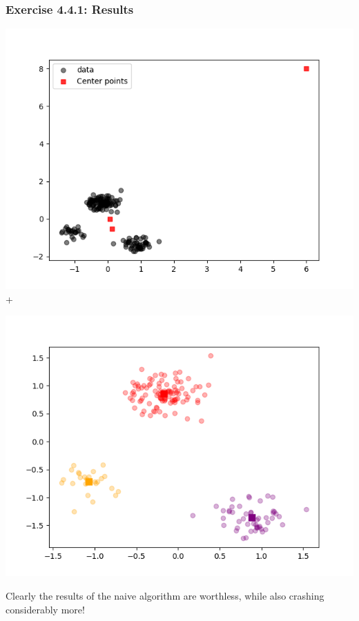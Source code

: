 \documentclass[10pt,aspectratio=169,handout]{beamer}
\begin{document}
\begin{frame}
    \frametitle{Exercise 4.4.1: Results}
    \begin{minipage}{0.49\textwidth}
        \includegraphics[width=\textwidth]{images/kmeans-n.png}+
    \end{minipage}
    \begin{minipage}{0.49\textwidth}
        \includegraphics[width=\textwidth]{images/blob_mean4.4.png}
    \end{minipage}

    Clearly the results of the naive algorithm are worthless, while also crashing considerably more!
\end{frame}
\end{document}
